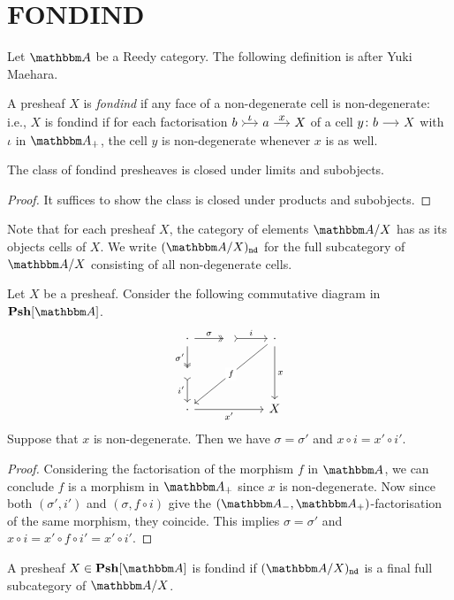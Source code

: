 \documentclass[a4paper,dvipsnames, 11pt]{amsart} %
\begin{document}
\section{FONDIND}
Let $\dgm{A}$ be a Reedy category.
The following definition is after Yuki Maehara.
\begin{definition}
	A presheaf $X$ is \emph{fondind} if any face of a non-degenerate cell is non-degenerate: i.e.,
	$X$ is fondind if
	for each factorisation $b\arr"\iota"[tail]a\arr"x"X$ of a cell $y\colon b \arr X$ with $\iota$ in $\dgm{A}_+$,
	the cell $y$ is non-degenerate whenever $x$ is as well.
\end{definition}
\begin{proposition}
	The class of fondind presheaves is closed under limits and subobjects.
\end{proposition}
\begin{proof}
	It suffices to show the class is closed under products and subobjects. 
\end{proof}
Note that for each presheaf $X$, the category of elements $\dgm{A}/X$ has as its objects cells of $X$.
We write $\ndcat{X}$ for the full subcategory of $\dgm{A}/X$ consisting of all non-degenerate cells.
\begin{lemma}
	\label{lem:connectednondeg}
	Let $X$ be a presheaf.
	Consider the following commutative diagram in $\Psh[\dgm{A}]$.
	\[
		\begin{tikzcd}
			\cdot
			\ar[d,two heads,"\sigma'"']
			\ar[r,two heads,"\sigma"]
				&
				{}
				\ar[r,tail,"i"]
					&
					\cdot
					\ar[dd,"x"]
					\ar[ddll,"f"description]
			\\
			{}
			\ar[d,tail,"i'"']
				&
				{}
					&
					{}
			\\
			\cdot
			\ar[rr,"x'"']
				&
				{}
					&
					X
		\end{tikzcd}
	\]
	Suppose that $x$ is non-degenerate.
	Then we have $\sigma=\sigma'$ and $x\circ i=x' \circ i'$.
\end{lemma}
\begin{proof}
	Considering the factorisation of the morphism $f$ in $\dgm{A}$, we can conclude $f$ is a morphism in $\dgm{A}_+$ since $x$ is non-degenerate.
	Now since both $(\sigma',i')$ and $(\sigma,f\circ i)$ give the $(\dgm{A}_-,\dgm{A}_+)$-factorisation of the same morphism,
	they coincide. This implies $\sigma=\sigma'$ and $x\circ i=x'\circ f\circ i'= x'\circ i'$.
\end{proof}
\begin{proposition}
	\label{prop:ndaf_fondind}
	A presheaf
	$X\in\Psh[\dgm{A}]$ is fondind
	if $\ndcat{X}$ is a final full subcategory of $\dgm{A}/X$.
\end{proposition}
\end{document}
